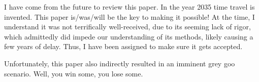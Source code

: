 \documentclass[12pt]{sigbovik-review}
\author{Reviewer from the future}
\begin{document}
\maketitle

I have come from the future to review this paper.
In the year 2035 time travel is invented. This paper is/was/will be the key to making it possible! At the time, I understand it was not terrifically well-received, due to its seeming lack of rigor, which admittedly did impede our understanding of its methods, likely causing a few years of delay. Thus, I have been assigned to make sure it gets accepted.

Unfortunately, this paper also indirectly resulted in an imminent grey goo scenario. Well, you win some, you lose some.
\end{document}
